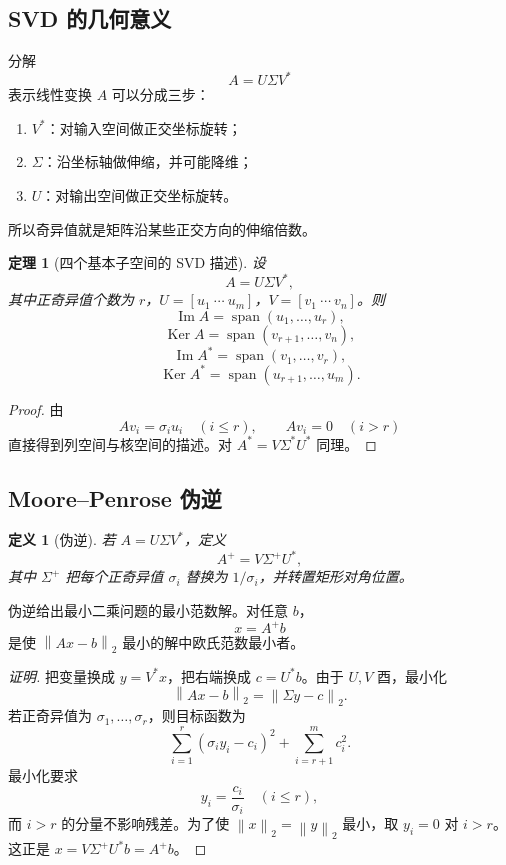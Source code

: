 \documentclass[UTF8,openany,zihao=-4]{ctexbook}
\theoremstyle{cnplain}
\newtheorem{definition}{定义}[chapter]
\newtheorem{theorem}{定理}[chapter]
\newcommand{\Ker}{\operatorname{Ker}}
\newcommand{\Img}{\operatorname{Im}}
\newcommand{\Span}{\operatorname{span}}
\newcommand{\norm}[1]{\left\lVert #1\right\rVert}
\begin{document}
\subsection{SVD 的几何意义}

分解
\[
A=U\Sigma V^*
\]
表示线性变换 $A$ 可以分成三步：
\begin{enumerate}
  \item $V^*$：对输入空间做正交坐标旋转；
  \item $\Sigma$：沿坐标轴做伸缩，并可能降维；
  \item $U$：对输出空间做正交坐标旋转。
\end{enumerate}
所以奇异值就是矩阵沿某些正交方向的伸缩倍数。

\begin{theorem}[四个基本子空间的 SVD 描述]
设
\[
A=U\Sigma V^*,
\]
其中正奇异值个数为 $r$，$U=[u_1\ \cdots\ u_m]$，$V=[v_1\ \cdots\ v_n]$。则
\[
\Img A=\Span(u_1,
\ldots,u_r),
\]
\[
\Ker A=\Span(v_{r+1},
\ldots,v_n),
\]
\[
\Img A^*=\Span(v_1,
\ldots,v_r),
\]
\[
\Ker A^*=\Span(u_{r+1},
\ldots,u_m).
\]
\end{theorem}

\begin{proof}
由
\[
Av_i=\sigma_i u_i\quad(i\le r),
\qquad
Av_i=0\quad(i>r)
\]
直接得到列空间与核空间的描述。对 $A^*=V\Sigma^*U^*$ 同理。
\end{proof}

\subsection{Moore--Penrose 伪逆}

\begin{definition}[伪逆]
若 $A=U\Sigma V^*$，定义
\[
A^+=V\Sigma^+U^*,
\]
其中 $\Sigma^+$ 把每个正奇异值 $\sigma_i$ 替换为 $1/\sigma_i$，并转置矩形对角位置。
\end{definition}

伪逆给出最小二乘问题的最小范数解。对任意 $b$，
\[
x=A^+b
\]
是使 $\norm{Ax-b}_2$ 最小的解中欧氏范数最小者。

\begin{proof}[证明]
把变量换成 $y=V^*x$，把右端换成 $c=U^*b$。由于 $U,V$ 酉，最小化
\[
\norm{Ax-b}_2=\norm{\Sigma y-c}_2.
\]
若正奇异值为 $\sigma_1,
\ldots,\sigma_r$，则目标函数为
\[
\sum_{i=1}^r(\sigma_i y_i-c_i)^2+
\sum_{i=r+1}^m c_i^2.
\]
最小化要求
\[
y_i=\frac{c_i}{\sigma_i}\quad(i\le r),
\]
而 $i>r$ 的分量不影响残差。为了使 $\norm{x}_2=\norm{y}_2$ 最小，取 $y_i=0$ 对 $i>r$。这正是 $x=V\Sigma^+U^*b=A^+b$。
\end{proof}
\end{document}
